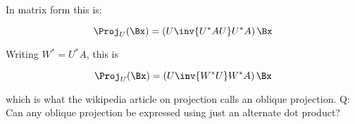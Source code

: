 In matrix form this is:

\begin{equation}
\Proj_U(\Bx) = \left(U \inv{U^* A U} U^* A\right) \Bx
\end{equation}

Writing $W^* = U^* A$, this is

\begin{equation*}
\Proj_U(\Bx) = \left(U \inv{W^* U} W^* A\right) \Bx
\end{equation*}

which is what the wikipedia article on projection calls an oblique projection.  Q: Can any oblique projection be expressed using just an alternate dot product?
